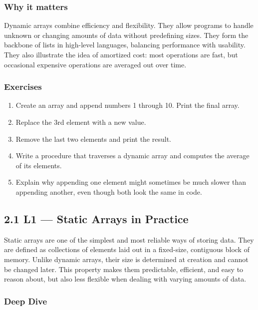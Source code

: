 \documentclass[
  letterpaper,
  DIV=11,
  numbers=noendperiod]{scrreprt}
\providecommand{\tightlist}{%
  \setlength{\itemsep}{0pt}\setlength{\parskip}{0pt}}
\begin{document}
\subsubsection{Why it matters}\label{why-it-matters-12}

Dynamic arrays combine efficiency and flexibility. They allow programs
to handle unknown or changing amounts of data without predefining sizes.
They form the backbone of lists in high-level languages, balancing
performance with usability. They also illustrate the idea of amortized
cost: most operations are fast, but occasional expensive operations are
averaged out over time.

\subsubsection{Exercises}\label{exercises-12}

\begin{enumerate}
\def\labelenumi{\arabic{enumi}.}
\tightlist
\item
  Create an array and append numbers 1 through 10. Print the final
  array.
\item
  Replace the 3rd element with a new value.
\item
  Remove the last two elements and print the result.
\item
  Write a procedure that traverses a dynamic array and computes the
  average of its elements.
\item
  Explain why appending one element might sometimes be much slower than
  appending another, even though both look the same in code.
\end{enumerate}

\subsection{2.1 L1 --- Static Arrays in
Practice}\label{l1-static-arrays-in-practice}

Static arrays are one of the simplest and most reliable ways of storing
data. They are defined as collections of elements laid out in a
fixed-size, contiguous block of memory. Unlike dynamic arrays, their
size is determined at creation and cannot be changed later. This
property makes them predictable, efficient, and easy to reason about,
but also less flexible when dealing with varying amounts of data.

\subsubsection{Deep Dive}\label{deep-dive-4}
\end{document}
